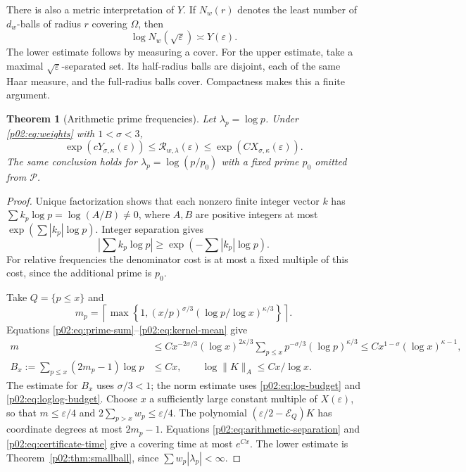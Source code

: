 \documentclass[11pt,letterpaper]{article}
\newtheorem{theorem}{Theorem}[section]
\theoremstyle{definition}
\theoremstyle{remark}
\newcommand{\eps}{\varepsilon}
\newcommand{\1}{\mathbf 1}
\begin{document}
There is also a metric interpretation of $Y$. If $N_w(r)$ denotes the
least number of $d_w$-balls of radius $r$ covering $\Omega$, then
\begin{equation}\label{p02:eq:metric-entropy}
 \log N_w(\sqrt\eps)\asymp Y(\eps).
\end{equation}
The lower estimate follows by measuring a cover. For the upper estimate,
take a maximal $\sqrt\eps$-separated set. Its half-radius balls are
disjoint, each of the same Haar measure, and the full-radius balls
cover. Compactness makes this a finite argument.

\begin{theorem}[Arithmetic prime frequencies]\label{p02:thm:arithmetic-flow}
Let $\lambda_p=\log p$. Under \eqref{p02:eq:weights} with $1<\sigma<3$,
\begin{equation}\label{p02:eq:arithmetic-flow}
 \exp(cY_{\sigma,\kappa}(\eps))
 \le\mathcal R_{w,\lambda}(\eps)
 \le\exp(CX_{\sigma,\kappa}(\eps)).
\end{equation}
The same conclusion holds for $\lambda_p=\log(p/p_0)$ with a fixed
prime $p_0$ omitted from $\mathcal P$.
\end{theorem}
\begin{proof}
Unique factorization shows that each nonzero finite integer vector $k$
has $\sum k_p\log p=\log(A/B)\ne0$, where $A,B$ are positive integers
at most $\exp(\sum|k_p|\log p)$. Integer separation gives
\begin{equation}\label{p02:eq:arithmetic-separation}
 \left|\sum k_p\log p\right|
 \ge \exp\left(-\sum|k_p|\log p\right).
\end{equation}
For relative frequencies the denominator cost is at most a fixed
multiple of this cost, since the additional prime is $p_0$.

Take $Q=\{p\le x\}$ and
\[
 m_p=\left\lceil\max\left\{1,
 (x/p)^{\sigma/3}(\log p/\log x)^{\kappa/3}\right\}\right\rceil.
\]
Equations \eqref{p02:eq:prime-sum}--\eqref{p02:eq:kernel-mean} give
\begin{align*}
 m&\le Cx^{-2\sigma/3}(\log x)^{2\kappa/3}
       \sum_{p\le x}p^{-\sigma/3}(\log p)^{\kappa/3}
       \le Cx^{1-\sigma}(\log x)^{\kappa-1},\\
 B_x:=\sum_{p\le x}(2m_p-1)\log p&\le Cx,\qquad
 \log\|K\|_A\le Cx/\log x.
\end{align*}
The estimate for $B_x$ uses $\sigma/3<1$; the norm estimate uses
\eqref{p02:eq:log-budget} and \eqref{p02:eq:loglog-budget}.
Choose $x$ a sufficiently large constant multiple of $X(\eps)$,
so that $m\le\eps/4$ and $2\sum_{p>x}w_p\le\eps/4$.
The polynomial $(\eps/2-\mathcal E_Q)K$ has coordinate degrees
at most $2m_p-1$. Equations \eqref{p02:eq:arithmetic-separation} and
\eqref{p02:eq:certificate-time} give a covering time at most $e^{Cx}$.
The lower estimate is Theorem~\ref{p02:thm:smallball}, since
$\sum w_p|\lambda_p|<\infty$.
\end{proof}
\end{document}
